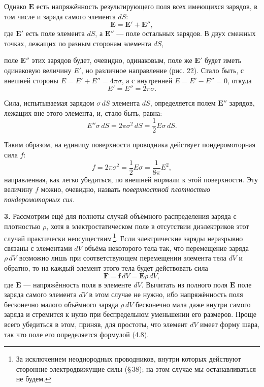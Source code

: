 \documentclass[a4paper,10pt]{article}
\begin{document}
Однако $\mathbf{E}$ есть напряжённость результирующего поля всех
имеющихся зарядов, в том числе и заряда самого элемента $dS$:
$$
    \mathbf{E} = \mathbf{E}' + \mathbf{E}'',
$$
где $\mathbf{E}'$ есть поле элемента $dS$, а $\mathbf{E}''$ — поле
остальных зарядов. В двух смежных точках, лежащих по разным сторонам
элемента $dS$,


поле $\mathbf{E}''$ этих зарядов будет, очевидно, одинаковым, поле же
$\mathbf{E}'$ будет иметь одинаковую величину $E'$, но различное
направление (рис. 22). Стало быть, с внешней стороны $E = E' + E'' =
4\pi\sigma$, а с внутренней $E = E' - E'' = 0$, откуда
$$
    E' = E'' = 2\pi\sigma.
$$

Сила, испытываемая зарядом $\sigma\,dS$ элемента $dS$, определяется
полем $\mathbf{E}''$ зарядов, лежащих вне этого элемента, и, стало
быть, равна:
$$
    E''\sigma\,dS = 2\pi\sigma^2\,dS = \frac{1}{2}E\sigma\,dS.
$$

Таким образом, на единицу поверхности проводника действует
пондеромоторная сила $f$:
\begin{equation}
    f = 2\pi\sigma^2 = \frac{1}{2}E\sigma = \frac{1}{8\pi}E^2,
    \tag{17.2}
\end{equation}
направленная, как легко убедиться, по внешней нормали к этой
поверхности. Эту величину $f$ можно, очевидно, назвать
\textit{поверхностной плотностью пондеромоторных сил}.

\textbf{3.} Рассмотрим ещё для полноты случай объёмного распределения
заряда с плотностью $\rho$, хотя в электростатическом поле в отсутствии
диэлектриков этот случай практически неосуществим\,\footnote{За
исключением неоднородных проводников, внутри которых действуют сторонние
электродвижущие силы (§\,38); на этом случае мы останавливаться не
будем.}. Если электрические заряды неразрывно связаны с элементами $dV$
объёма некоторого тела так, что перемещение заряда $\rho\,dV$ возможно
лишь при соответствующем перемещении элемента тела $dV$ и обратно, то
на каждый элемент этого тела будет действовать сила
\begin{equation}
    \mathbf{F} = \mathbf{f}\,dV = \mathbf{E}\rho\,dV,
    \tag{17.3}
\end{equation}
где $\mathbf{E}$ — напряжённость поля в элементе $dV$. Вычитать из
полного поля $\mathbf{E}$ поле заряда самого элемента $dV$ в этом случае
не нужно, ибо напряжённость поля бесконечно малого объёмного заряда
$\rho\,dV$ бесконечно мала даже внутри самого заряда и стремится к нулю
при беспредельном уменьшении его размеров. Проще всего убедиться в этом,
приняв, для простоты, что элемент $dV$ имеет форму шара, так что поле
его определяется формулой (4.8).
\end{document}
